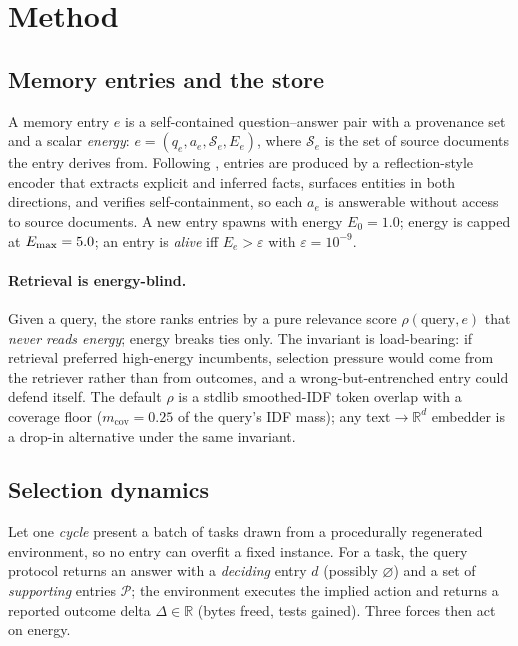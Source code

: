 \section{Method}
\label{sec:method}

\subsection{Memory entries and the store}
A memory entry $e$ is a self-contained question--answer pair with a
provenance set and a scalar \emph{energy}:
$e = (q_e, a_e, \mathcal{S}_e, E_e)$, where $\mathcal{S}_e$ is the set of
source documents the entry derives from. Following \citet{quek2026memo},
entries are produced by a reflection-style encoder that extracts explicit
and inferred facts, surfaces entities in both directions, and verifies
self-containment, so each $a_e$ is answerable without access to source
documents. A new entry spawns with energy $E_0 = 1.0$; energy is capped at
$E_{\max} = 5.0$; an entry is \emph{alive} iff $E_e > \varepsilon$ with
$\varepsilon = 10^{-9}$.

\paragraph{Retrieval is energy-blind.}
Given a query, the store ranks entries by a pure relevance score
$\rho(\text{query}, e)$ that \emph{never reads energy}; energy breaks ties
only. The invariant is load-bearing: if retrieval preferred high-energy
incumbents, selection pressure would come from the retriever rather than
from outcomes, and a wrong-but-entrenched entry could defend itself. The
default $\rho$ is a stdlib smoothed-IDF token overlap with a coverage
floor ($m_{\text{cov}} = 0.25$ of the query's IDF mass); any
$\text{text}\!\to\!\mathbb{R}^d$ embedder is a drop-in alternative under
the same invariant.

\subsection{Selection dynamics}
Let one \emph{cycle} present a batch of tasks drawn from a procedurally
regenerated environment, so no entry can overfit a fixed instance. For a
task, the query protocol returns an answer with a \emph{deciding} entry
$d$ (possibly $\varnothing$) and a set of \emph{supporting} entries
$\mathcal{P}$; the environment executes the implied action and returns a
reported outcome delta $\Delta \in \mathbb{R}$ (bytes freed, tests
gained). Three forces then act on energy.

